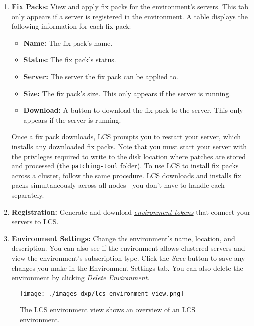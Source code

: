 \begin{enumerate}
\def\labelenumi{\arabic{enumi}.}
\item
  \textbf{Fix Packs:} View and apply fix packs for the environment's
  servers. This tab only appears if a server is registered in the
  environment. A table displays the following information for each fix
  pack:

  \begin{itemize}
  \tightlist
  \item
    \textbf{Name:} The fix pack's name.
  \item
    \textbf{Status:} The fix pack's status.
  \item
    \textbf{Server:} The server the fix pack can be applied to.
  \item
    \textbf{Size:} The fix pack's size. This only appears if the server
    is running.
  \item
    \textbf{Download:} A button to download the fix pack to the server.
    This only appears if the server is running.
  \end{itemize}

  Once a fix pack downloads, LCS prompts you to restart your server,
  which installs any downloaded fix packs. Note that you must start your
  server with the privileges required to write to the disk location
  where patches are stored and processed (the \texttt{patching-tool}
  folder). To use LCS to install fix packs across a cluster, follow the
  same procedure. LCS downloads and installs fix packs simultaneously
  across all nodes---you don't have to handle each separately.
\item
  \textbf{Registration:} Generate and download
  \hyperref[using-environment-tokens]{\emph{environment tokens}} that
  connect your servers to LCS.
\item
  \textbf{Environment Settings:} Change the environment's name,
  location, and description. You can also see if the environment allows
  clustered servers and view the environment's subscription type. Click
  the \emph{Save} button to save any changes you make in the Environment
  Settings tab. You can also delete the environment by clicking
  \emph{Delete Environment}.
\end{enumerate}

\begin{figure}
\centering
\texttt{[image: ./images-dxp/lcs-environment-view.png]}
\caption{The LCS environment view shows an overview of an LCS
environment.}
\end{figure}

